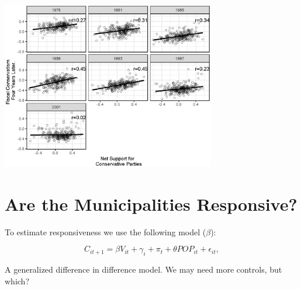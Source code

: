 \documentclass[10pt,aspectratio=169]{beamer}
\begin{document}
\begin{frame}
\centering
	\includegraphics[width=0.7\textwidth]{images/correlations_across_time.eps}
\end{frame}
	
\section[Responsiveness]{Are the Municipalities Responsive?}


\begin{frame}
To estimate responsiveness we use the following model ($\beta$):

\vspace{0.2in}

\begin{equation*}
C_{it+1} =  \beta  V_{it} + \gamma_i +  \pi_t + \theta POP_{it}  +\epsilon_{it},
\end{equation*}

\vspace{0.2in}

A generalized difference in difference model. We may need more controls, but which?

\end{frame}
\end{document}
